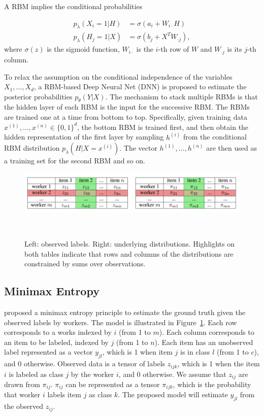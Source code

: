\documentclass{article}
\begin{document}
A RBM implies the conditional probabilities

\begin{align*}
p_{\lambda}(X_i=1|H) &= \sigma (a_i+W_{i\cdot}H) \\
p_{\lambda}(H_j=1|X) &= \sigma (b_j+X^{T}W_{\cdot j}),
\end{align*}
where $\sigma (z)$ is the sigmoid function, $W_{i\cdot}$ is the $i$-th
row of $W$ and $W_{\cdot j}$ is its $j$-th column.

To relax the assumption on the conditional independence of the
variables $X_1,\ldots,X_d$, a RBM-based Deep Neural Net (DNN) is
proposed to estimate the posterior probabilities
$p_{\theta}(Y|X)$. The mechanism to stack multiple RBMs is that the
hidden layer of each RBM is the input for the successive RBM. The RBMs
are trained one at a time from bottom to top. Specifically, given
training data $x^{(1)}, \ldots, x^{(n)} \in \{ 0,1 \}^d$, the bottom
RBM is trained first, and then obtain the hidden representation of the
first layer by sampling $h^{(i)}$ from the conditional RBM
distribution $p_{\lambda}(H|X=x^{(i)})$. The vector $h^{(1)}, \ldots,
h^{(n)}$ are then used as a training set for the second RBM and so on.

\begin{figure}[h]
  \centering
  \includegraphics[width=0.95\columnwidth]{minimax_entropy.png}
  \caption{Left: observed labels. Right: underlying
    distributions. Highlights on both tables indicate that rows and
    columns of the distributions are constrained by sums over observations.}
  ~\label{fg:minimax_entropy_model}
\end{figure}

\subsection{Minimax Entropy}
\cite{Zhou2012-ry} proposed a minimax entropy principle to estimate
the ground truth given the observed labels by workers. The model is
illustrated in Figure~\ref{fg:minimax_entropy_model}. Each row
corresponds to a works indexed by $i$ (from 1 to $m$). Each column
corresponds to an item to be labeled, indexed by $j$ (from 1 to
$n$). Each item has an unobserved label represented as a vector
$y_{jl}$, which is 1 when item $j$ is in class $l$ (from 1 to $c$),
and 0 otherwise. Observed data is a tensor of labels $z_{ijk}$, which
is 1 when the item $i$ is labeled as class $j$ by the worker $i$, and
0 otherwise. We assume that $z_{ij}$ are drawn from
$\pi_{ij}$. $\pi_{ij}$ can be represented as a tensor $\pi_{ijk}$,
which is the probability that worker $i$ labels item $j$ as class
$k$. The proposed model will estimate $y_{jl}$ from the observed
$z_{ij}$.
\end{document}
